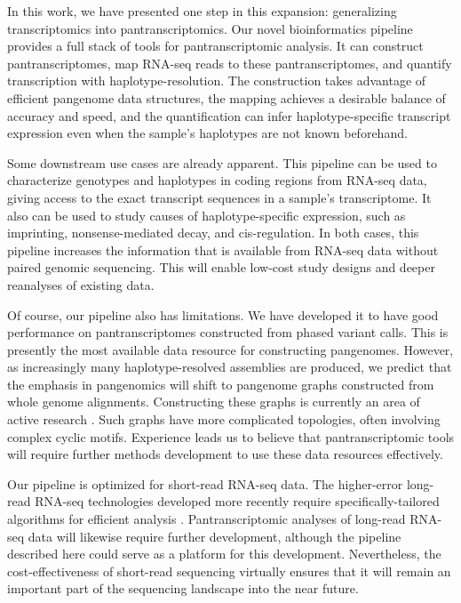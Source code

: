 \documentclass[11pt]{ucthesis}
\begin{document}
In this work, we have presented one step in this expansion: generalizing transcriptomics into pantranscriptomics. Our novel bioinformatics pipeline provides a full stack of tools for pantranscriptomic analysis. It can construct pantranscriptomes, map RNA-seq reads to these pantranscriptomes, and quantify transcription with haplotype-resolution. The construction takes advantage of efficient pangenome data structures, the mapping achieves a desirable balance of accuracy and speed, and the quantification can infer haplotype-specific transcript expression even when the sample's haplotypes are not known beforehand.

Some downstream use cases are already apparent. This pipeline can be used to characterize genotypes and haplotypes in coding regions from RNA-seq data, giving access to the exact transcript sequences in a sample's transcriptome. It also can be used to study causes of haplotype-specific expression, such as imprinting, nonsense-mediated decay, and cis-regulation. In both cases, this pipeline increases the information that is available from RNA-seq data without paired genomic sequencing. This will enable low-cost study designs and deeper reanalyses of existing data.

Of course, our pipeline also has limitations. We have developed it to have good performance on pantranscriptomes constructed from phased variant calls. This is presently the most available data resource for constructing pangenomes. However, as increasingly many haplotype-resolved assemblies are produced, we predict that the emphasis in pangenomics will shift to pangenome graphs constructed from whole genome alignments. Constructing these graphs is currently an area of active research \cite{li2020design,jandrasits2018seq}. Such graphs have more complicated topologies, often involving complex cyclic motifs. Experience leads us to believe that pantranscriptomic tools will require further methods development to use these data resources effectively.

Our pipeline is optimized for short-read RNA-seq data. The higher-error long-read RNA-seq technologies developed more recently require specifically-tailored algorithms for efficient analysis \cite{li2018minimap2,wyman2019technology}. Pantranscriptomic analyses of long-read RNA-seq data will likewise require further development, although the pipeline described here could serve as a platform for this development. Nevertheless, the cost-effectiveness of short-read sequencing virtually ensures that it will remain an important part of the sequencing landscape into the near future.
\end{document}
